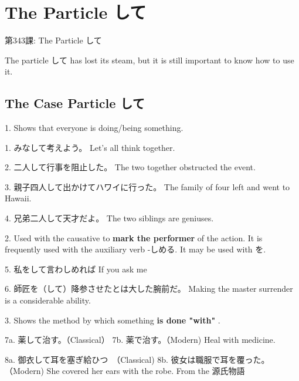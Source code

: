     
\chapter{The Particle して}

\begin{center}
\begin{Large}
第343課: The Particle して 
\end{Large}
\end{center}
 
\par{  The particle して has lost its steam, but it is still important to know how to use it. }
      
\section{The Case Particle して}
 1. Shows that everyone is doing\slash being something. 
\par{1. みなして考えよう。 \hfill\break
Let's all think together. }

\par{2. 二人して行事を阻止した。 \hfill\break
The two together obstructed the event. }

\par{3. 親子四人して出かけてハワイに行った。 \hfill\break
The family of four left and went to Hawaii. }

\par{4. 兄弟二人して天才だよ。 \hfill\break
The two siblings are geniuses. \hfill\break
}

\par{2. Used with the causative to \textbf{mark the performer }of the action. It is frequently used with the auxiliary verb -しめる. It may be used with を. }

\par{5. 私をして言わしめれば \hfill\break
If you ask me }

\par{6. 師匠を（して）降参させたとは大した腕前だ。 \hfill\break
Making the master surrender is a considerable ability. \hfill\break
}

\par{3. Shows the method by which something \textbf{is done "with" }. }

\par{7a. 薬して治す。（Classical） \hfill\break
7b. 薬で治す。（Modern) \hfill\break
Heal with medicine. }

\par{8a. 御衣して耳を塞ぎ給ひつ　（Classical) \hfill\break
8b. 彼女は職服で耳を覆った。（Modern) \hfill\break
She covered her ears with the robe. \hfill\break
From the 源氏物語 }
      
